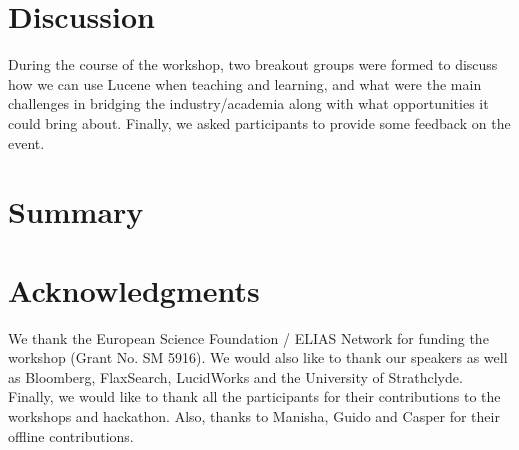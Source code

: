 \documentclass[12pt]{article}
\begin{document}
\begin{sloppypar}


\section{Discussion}
During the course of the workshop, two breakout groups were formed to discuss how we can use Lucene when teaching and learning, and what were the main challenges in bridging the industry/academia along with what opportunities it could bring about. Finally, we asked participants to provide some feedback on the event.










\section{Summary}

\section{Acknowledgments}
We thank the European Science Foundation / ELIAS Network for funding the workshop (Grant No. SM 5916). We would also like to thank our speakers as well as Bloomberg, FlaxSearch, LucidWorks and the University of Strathclyde. Finally, we would like to thank all the participants for their contributions to the workshops and hackathon. Also, thanks to Manisha, Guido and Casper for their offline contributions.



{}


%
\end{sloppypar}
\end{document}

